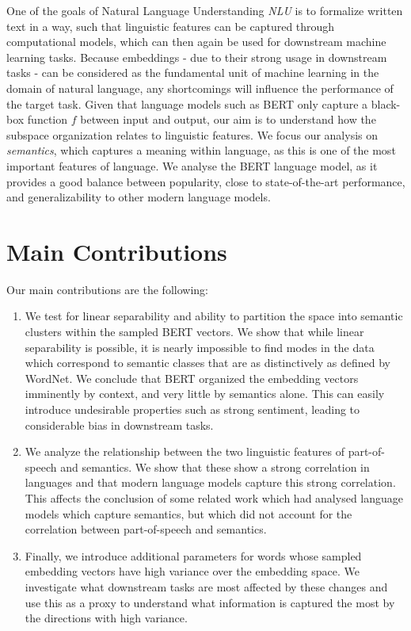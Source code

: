 \documentclass[a4paper,12pt,oneside,openright]{report}
\begin{document}
One of the goals of Natural Language Understanding \textit{NLU} is to formalize written text in a way, such that linguistic features can be captured through computational models, which can then again be used for downstream machine learning tasks.
Because embeddings - due to their strong usage in downstream tasks - can be considered as the fundamental unit of machine learning in the domain of natural language, any shortcomings will influence the performance of the target task.
Given that language models such as BERT only capture a black-box function $f$ between input and output, our aim is to understand how the subspace organization relates to linguistic features.
We focus our analysis on \textit{semantics}, which captures a meaning within language, as this is one of the most important features of language. 
We analyse the BERT language model, as it provides a good balance between popularity, close to state-of-the-art performance, and generalizability to other modern language models.
\\

\section{Main Contributions}

Our main contributions are the following: \\

\begin{enumerate}
\item We test for linear separability and ability to partition the space into semantic clusters within the sampled BERT vectors.
We show that while linear separability is possible, it is nearly impossible to find modes in the data which correspond to semantic classes that are as distinctively as defined by WordNet.
We conclude that BERT organized the embedding vectors imminently by context, and very little by semantics alone.
This can easily introduce undesirable properties such as strong sentiment, leading to considerable bias in downstream tasks.
\item We analyze the relationship between the two linguistic features of part-of-speech and semantics. 
We show that these show a strong correlation in languages and that modern language models capture this strong correlation.
This affects the conclusion of some related work which had analysed language models which capture semantics, but which did not account for the correlation between part-of-speech and semantics.
\item Finally, we introduce additional parameters for words whose sampled embedding vectors have high variance over the embedding space.
We investigate what downstream tasks are most affected by these changes and use this as a proxy to understand what information is captured the most by the directions with high variance. 
\end{enumerate}
\end{document}
